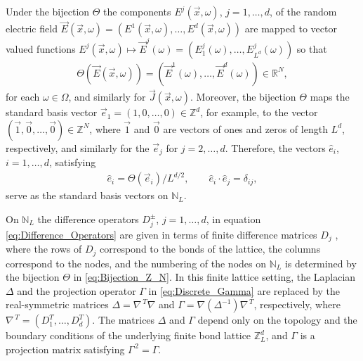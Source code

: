 \documentclass{cmslatex}
\begin{document}
Under the bijection $\Theta$ the components
$E^j(\vec{x},\omega)$, $j=1,\ldots,d$, of the random electric field
$\vec{E}(\vec{x},\omega)=(E^1(\vec{x},\omega),\ldots ,E^d(\vec{x},\omega))$ are mapped to
vector valued functions $E^j(\vec{x},\omega)\mapsto\vec{E}^j(\omega)=(E^j_1(\omega),\ldots,
E^j_{L^d}(\omega))$ so that
% 
\begin{align}\label{eq:bijection_vector_mapping}
  \Theta(\vec{E}(\vec{x},\omega))=(\vec{E}^1(\omega),\ldots ,\vec{E}^d(\omega))\in\mathbb{R}^N,
\end{align}
%
for each $\omega\in\Omega$, and similarly for $\vec{J}(\vec{x},\omega)$. Moreover, the
bijection $\Theta$ maps the standard basis vector
$\vec{e}_1=(1,0,\ldots,0)\in\mathbb{Z}^d$, for example, to the
vector $(\vec{1},\vec{0},\ldots,\vec{0})\in\mathbb{Z}^N$, where
$\vec{1}$ and $\vec{0}$ are vectors of ones and zeros of length
$L^d$, respectively, and similarly for the $\vec{e}_j$ for
$j=2,\ldots,d$. Therefore, the vectors $\hat{e}_i$, $i=1,\ldots,d$, satisfying
%
\begin{align}\label{eq:Lattice_Basis_e}
  \hat{e}_i=\Theta(\vec{e}_i)/L^{d/2},
  \qquad
  \hat{e}_i\cdot\hat{e}_j=\delta_{ij},
\end{align}
%
serve as the standard basis vectors on $\mathbb{N}_L$.


On $\mathbb{N}_L$ the difference operators $D_j^\pm$, $j=1,\ldots,d$, in
equation \eqref{eq:Difference_Operators} are given in terms of finite 
difference matrices $D_j$ \cite{Demmel:1997}, where the rows of $D_j$
correspond to the bonds of the lattice, the columns
correspond to the nodes, and the numbering of the nodes on
$\mathbb{N}_L$ is determined by the bijection $\Theta$ in
\eqref{eq:Bijection_Z_N}. In this finite lattice 
setting, the Laplacian $\Delta$ and the projection operator $\Gamma$ in
\eqref{eq:Discrete_Gamma} are replaced by the real-symmetric matrices
$\Delta=\nabla^{\,T}\nabla$ and $\Gamma=\nabla(\Delta^{-1})\nabla^{\,T}$, respectively, where
$\nabla^{\,T}=(D_1^T,\ldots,D_d^T)$. The matrices $\Delta$ and $\Gamma$ depend only on the
topology and the boundary conditions of the underlying finite bond
lattice $\mathbb{Z}_L^d$, and $\Gamma$ is a projection matrix
satisfying $\Gamma^{\,2}=\Gamma$. 
\end{document}
